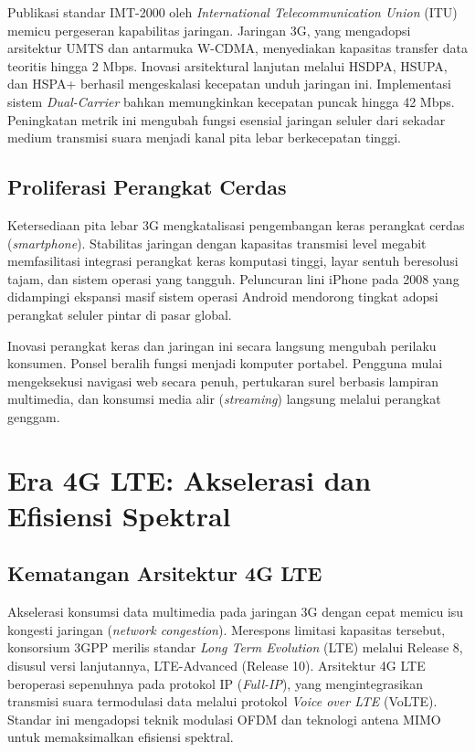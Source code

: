 \documentclass[12pt,a4paper]{article}
\begin{document}
Publikasi standar IMT-2000 oleh \textit{International Telecommunication Union} (ITU) memicu pergeseran kapabilitas jaringan. Jaringan 3G, yang mengadopsi arsitektur UMTS dan antarmuka W-CDMA, menyediakan kapasitas transfer data teoritis hingga 2 Mbps. Inovasi arsitektural lanjutan melalui HSDPA, HSUPA, dan HSPA+ berhasil mengeskalasi kecepatan unduh jaringan ini. Implementasi sistem \textit{Dual-Carrier} bahkan memungkinkan kecepatan puncak hingga 42 Mbps. Peningkatan metrik ini mengubah fungsi esensial jaringan seluler dari sekadar medium transmisi suara menjadi kanal pita lebar berkecepatan tinggi.

\subsection{Proliferasi Perangkat Cerdas}
Ketersediaan pita lebar 3G mengkatalisasi pengembangan keras perangkat cerdas (\textit{smartphone}). Stabilitas jaringan dengan kapasitas transmisi level megabit memfasilitasi integrasi perangkat keras komputasi tinggi, layar sentuh beresolusi tajam, dan sistem operasi yang tangguh. Peluncuran lini iPhone pada 2008 yang didampingi ekspansi masif sistem operasi Android mendorong tingkat adopsi perangkat seluler pintar di pasar global.

Inovasi perangkat keras dan jaringan ini secara langsung mengubah perilaku konsumen. Ponsel beralih fungsi menjadi komputer portabel. Pengguna mulai mengeksekusi navigasi web secara penuh, pertukaran surel berbasis lampiran multimedia, dan konsumsi media alir (\textit{streaming}) langsung melalui perangkat genggam.

\newpage

\section{Era 4G LTE: Akselerasi dan Efisiensi Spektral}

\subsection{Kematangan Arsitektur 4G LTE}
Akselerasi konsumsi data multimedia pada jaringan 3G dengan cepat memicu isu kongesti jaringan (\textit{network congestion}). Merespons limitasi kapasitas tersebut, konsorsium 3GPP merilis standar \textit{Long Term Evolution} (LTE) melalui Release 8, disusul versi lanjutannya, LTE-Advanced (Release 10). Arsitektur 4G LTE beroperasi sepenuhnya pada protokol IP (\textit{Full-IP}), yang mengintegrasikan transmisi suara termodulasi data melalui protokol \textit{Voice over LTE} (VoLTE). Standar ini mengadopsi teknik modulasi OFDM dan teknologi antena MIMO untuk memaksimalkan efisiensi spektral.
\end{document}
